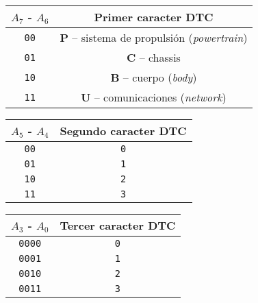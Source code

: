 \begin{table}[H]
  \centering
  \begin{minipage}{.32\linewidth}
    \begin{tabularx}{\textwidth}{|C{.3}|C{.7}|}
      \hline
      $A_7$ - $A_6$ & \textbf{Primer caracter \ac{DTC}}                         \\
      \hline
      \texttt{00}             & \textbf{P} -- sistema de propulsión (\textit{powertrain}) \\
      \texttt{01}             & \textbf{C} -- chassis                                     \\
      \texttt{10}             & \textbf{B} -- cuerpo (\textit{body})                      \\
      \texttt{11}             & \textbf{U} -- comunicaciones (\textit{network})           \\
      \hline
    \end{tabularx}
  \end{minipage}
  \hfill
  \begin{minipage}{.32\linewidth}
    \begin{tabularx}{\textwidth}{|C{.3}|C{.7}|}
      \hline
      $A_5$ - $A_4$ & \textbf{Segundo caracter \ac{DTC}} \\
      \hline
      \texttt{00}             & \texttt{0}                         \\
      \texttt{01}             & \texttt{1}                         \\
      \texttt{10}             & \texttt{2}                         \\
      \texttt{11}             & \texttt{3}                         \\
      \hline
    \end{tabularx}
  \end{minipage}
  \hfill
  \begin{minipage}{.32\linewidth}
    \begin{tabularx}{\textwidth}{|C{.3}|C{.7}|}
      \hline
      $A_3$ - $A_0$ & \textbf{Tercer caracter \ac{DTC}} \\
      \hline
      \texttt{0000}             & \texttt{0}                        \\
      \texttt{0001}             & \texttt{1}                        \\
      \texttt{0010}             & \texttt{2}                        \\
      \texttt{0011}             & \texttt{3}                        \\

\end{tabularx}
\end{minipage}
\end{table}
